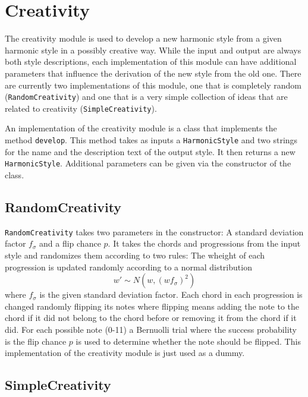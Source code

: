 \section{Creativity}

The creativity module is used to develop a new harmonic style from a given harmonic style in a possibly creative way.
While the input and output are always both style descriptions, each implementation of this module can have additional parameters that influence the derivation of the new style from the old one.
There are currently two implementations of this module, one that is completely random (\texttt{RandomCreativity}) and one that is a very simple collection of ideas that are related to creativity (\texttt{SimpleCreativity}).

An implementation of the creativity module is a class that implements the method \texttt{develop}.
This method takes as inputs a \texttt{HarmonicStyle} and two strings for the name and the description text of the output style.
It then returns a new \texttt{HarmonicStyle}.
Additional parameters can be given via the constructor of the class.

\subsection{RandomCreativity}

\texttt{RandomCreativity} takes two parameters in the constructor:
A standard deviation factor $f_\sigma$ and a flip chance $p$.
It takes the chords and progressions from the input style and randomizes them according to two rules:
The wheight of each progression is updated randomly according to a normal distribution
\[ w' \sim N(w, (w f_\sigma)^2)\]
where $f_\sigma$ is the given standard deviation factor.
Each chord in each progression is changed randomly flipping its notes where flipping means adding the note to the chord if it did not belong to the chord before or removing it from the chord if it did.
For each possible note (0-11) a Bernuolli trial where the success probability is the flip chance $p$ is used to determine whether the note should be flipped.
This implementation of the creativity module is just used as a dummy.

\subsection{SimpleCreativity}

